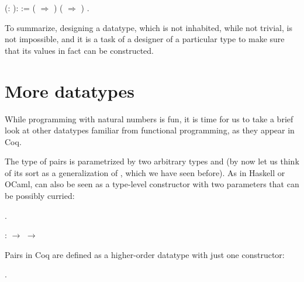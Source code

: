 \begin{coqdoccode}
\coqdocemptyline
\coqdocnoindent
{}  (: ):  :=\coqdoceol
\coqdocindent{1.00em}
 ( \coqdocvar{\_} \ensuremath{\Rightarrow} ) ( \coqdocvar{\_}  \ensuremath{\Rightarrow} ) .\coqdoceol
\coqdocemptyline
\end{coqdoccode}
To summarize, designing a datatype, which is not inhabited, while not
trivial, is not impossible, and it is a task of a designer of a
particular type to make sure that its values in fact can be
constructed.




\section{More datatypes}




While programming with natural numbers is fun, it is time for us to
take a brief look at other datatypes familiar from functional
programming, as they appear in Coq.


The type of pairs is parametrized by two arbitrary types  and
 (by now let us think of its sort  as a generalization of
, which we have seen before). As in Haskell
or OCaml,  can also be seen as a type-level constructor with two
parameters that can be possibly curried:
\begin{coqdoccode}
\coqdocemptyline
\coqdocnoindent
{} .\coqdoceol
\coqdocemptyline
\end{coqdoccode}
\coqdoceol
\coqdocemptyline
\coqdocnoindent
{} :  \ensuremath{\rightarrow}  \ensuremath{\rightarrow} 

\coqdocemptyline




Pairs in Coq are defined as a higher-order datatype  with just
one constructor:


\begin{coqdoccode}
\coqdocnoindent
{} .\coqdoceol
\end{coqdoccode}


